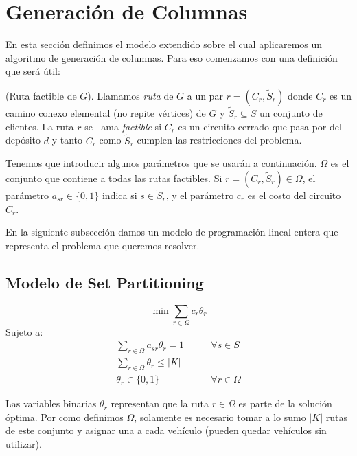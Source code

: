 \section{Generación de Columnas}

En esta sección definimos el modelo extendido sobre el cual aplicaremos un algoritmo de generación de columnas. Para eso comenzamos con una definición que será útil:

\begin{definition}
    (Ruta factible de $G$).
    Llamamos \emph{ruta} de $G$ a un par $r = (C_r, \tilde{S}_r)$ donde $C_r$ es un camino conexo elemental (no repite vértices) de $G$ y $\tilde{S}_r \subseteq S$ un conjunto de clientes. La ruta $r$ se llama \emph{factible} si $C_r$ es un circuito cerrado que pasa por del depósito $d$ y tanto $C_r$ como $\tilde{S}_r$ cumplen las restricciones del problema.
\end{definition}

Tenemos que introducir algunos parámetros que se usarán a continuación. $\Omega$ es el conjunto que contiene a todas las rutas factibles. Si $r = (C_r, \tilde{S}_r) \in \Omega$, el parámetro $a_{sr} \in \{0, 1\}$ indica si $s \in \tilde{S}_r$, y el parámetro $c_r$ es el costo del circuito $C_r$. 

En la siguiente subsección damos un modelo de programación lineal entera que representa el problema que queremos resolver.

\subsection{Modelo de Set Partitioning}
\label{section:set-partitioning}

\begin{equation}
    \min \sum_{r \in \Omega} c_r  \theta_r
\end{equation}
Sujeto a:
\begin{align}
    \sum_{r \in \Omega} {a_{sr}\theta_r} = 1
\qquad & \forall {s \in S} \label{eq:master1} \\
\sum_{r \in \Omega}{\theta_r} \leq |K| & \label{eq:master2} \\
\theta_r \in \{0, 1\} \qquad & \forall{r \in \Omega}
\end{align}

Las variables binarias $\theta_r$ representan que la ruta $r \in \Omega$ es parte de la solución óptima. Por como definimos $\Omega$, solamente es necesario tomar a lo sumo $|K|$ rutas de este conjunto y asignar una a cada vehículo (pueden quedar vehículos sin utilizar). 


